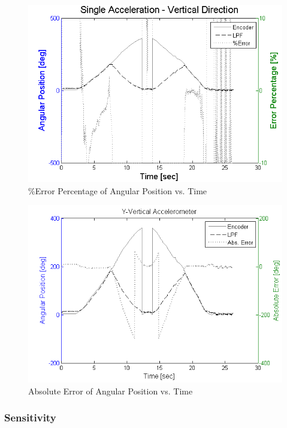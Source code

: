 \documentclass{article}
\theoremstyle{plain}
\theoremstyle{definition}
\theoremstyle{remark}
\begin{document}
\begin{figure}[hbt]
\begin{center}
\includegraphics[width = 13cm]{Y_ErrorPercentage.png}
\caption{\%Error Percentage of Angular Position vs. Time}
\label{Y_ErrorPercentage}
\end{center}
\end{figure}

\begin{figure}[hbt]
\begin{center}
\includegraphics[width = 13cm]{Y_AbsError.png}
\caption{Absolute Error of Angular Position vs. Time}
\label{Y_AbsError}
\end{center}
\end{figure}

\subsubsection{Sensitivity}
\end{document}
